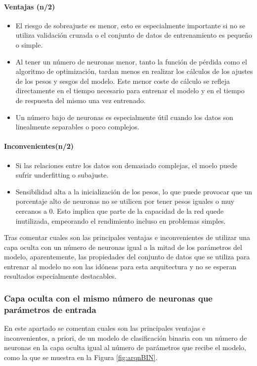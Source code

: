 \paragraph{Ventajas (n/2)}
\begin{itemize}
	\item El riesgo de sobreajuste es menor, esto es especialmente importante si no se utiliza validación cruzada o el conjunto de datos de entrenamiento es pequeño o simple.
	\item  Al tener un número de neuronas menor, tanto la función  de pérdida como el algoritmo de optimización, tardan menos en realizar los cálculos de los ajustes de los pesos y sesgos del modelo. Este menor coste de cálculo se refleja directamente en el tiempo necesario para entrenar el modelo y en el tiempo de respuesta del mismo una vez entrenado.
	\item Un número bajo de neuronas es especialmente útil cuando los datos son linealmente separables o poco complejos.
\end{itemize}
\paragraph{Inconvenientes(n/2)}
\begin{itemize}
	\item Si las relaciones entre los datos son demasiado complejas, el moelo puede sufrir underfitting o subajuste.
	\item Sensibilidad alta a la inicialización de los pesos, lo que puede provocar que un porcentaje alto de neuronas no se utilicen por tener pesos iguales o muy cercanos a 0. Esto implica que parte de la capacidad de la red quede inutilizada, empeorando el rendimiento incluso en problemas simples.
\end{itemize}

Tras comentar cuales son las principales ventajas e inconvenientes de utilizar una capa oculta con un número de neuronas igual a la mitad de los parámetros del modelo, aparentemente, las propiedades del conjunto de datos que se utiliza para entrenar al modelo no son las idóneas para esta arquitectura y no se esperan resultados especialmente destacables.

\subsubsection{Capa oculta con el mismo número de neuronas que parámetros de entrada}\label{sec:VIBIN49}
En este apartado se comentan cuales son las principales ventajas e inconvenientes, a priori, de un modelo de clasificación binaria con un número de neuronas en la capa oculta igual al número de parámetros que recibe el modelo, como la que se muestra en la Figura \ref{fig:arqnBIN}.

